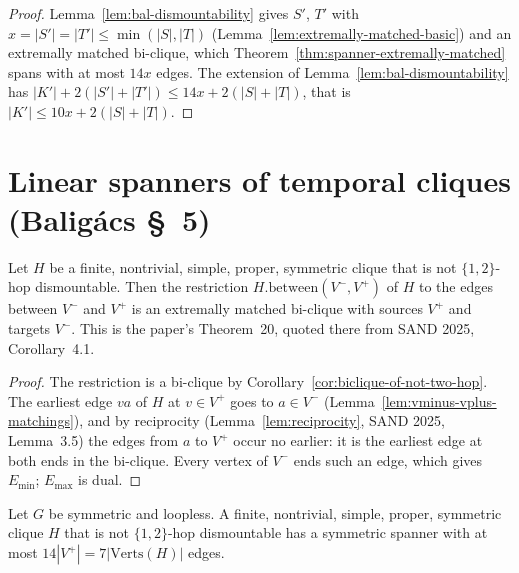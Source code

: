 \begin{proof}
  \leanok
  Lemma~\ref{lem:bal-dismountability} gives $S'$, $T'$ with
  $x = |S'| = |T'| \le \min(|S|, |T|)$ (Lemma~\ref{lem:extremally-matched-basic})
  and an extremally matched bi-clique, which Theorem~\ref{thm:spanner-extremally-matched}
  spans with at most $14x$ edges. The extension of Lemma~\ref{lem:bal-dismountability}
  has $|K'| + 2(|S'| + |T'|) \le 14x + 2(|S| + |T|)$, that is
  $|K'| \le 10x + 2(|S| + |T|)$.
\end{proof}

\section*{Linear spanners of temporal cliques (Baligács \S~5)}

\begin{theorem}
  \label{thm:extremally-matched-of-not-two-hop}
  \leanok
  Let $H$ be a finite, nontrivial, simple, proper, symmetric clique that is not
  $\{1,2\}$-hop dismountable. Then the restriction
  $H.\mathrm{between}(V^-, V^+)$ of $H$ to the edges between $V^-$ and $V^+$ is
  an extremally matched bi-clique with sources $V^+$ and targets $V^-$. This is
  the paper's Theorem~20, quoted there from SAND 2025, Corollary~4.1.
\end{theorem}

\begin{proof}
  \leanok
  The restriction is a bi-clique by Corollary~\ref{cor:biclique-of-not-two-hop}.
  The earliest edge $va$ of $H$ at $v \in V^+$ goes to $a \in V^-$
  (Lemma~\ref{lem:vminus-vplus-matchings}), and by reciprocity
  (Lemma~\ref{lem:reciprocity}, SAND 2025, Lemma~3.5) the edges from $a$ to
  $V^+$ occur no earlier: it is the earliest edge at both ends in the
  bi-clique. Every vertex of $V^-$ ends such an edge, which gives $E_{\min}$;
  $E_{\max}$ is dual.
\end{proof}

\begin{theorem}
  \label{thm:spanner-of-not-two-hop-linear}
  \leanok
  Let $G$ be symmetric and loopless. A finite, nontrivial, simple, proper,
  symmetric clique $H$ that is not $\{1,2\}$-hop dismountable has a symmetric
  spanner with at most $14|V^+| = 7|\mathrm{Verts}(H)|$ edges.
\end{theorem}

